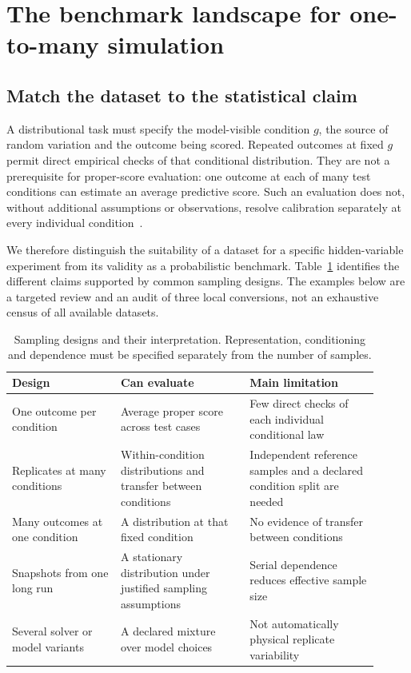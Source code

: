 ﻿%

\section{The benchmark landscape for one-to-many simulation}
\label{sec:bench}

\subsection{Match the dataset to the statistical claim}
\label{sec:bench:criterion}

A distributional task must specify the model-visible condition $g$, the source
of random variation and the outcome being scored. Repeated outcomes at fixed
$g$ permit direct empirical checks of that conditional distribution. They are
not a prerequisite for proper-score evaluation: one outcome at each of many
test conditions can estimate an average predictive score. Such an evaluation
does not, without additional assumptions or observations, resolve calibration
separately at every individual condition~\cite{gneiting2007strictly}.

We therefore distinguish the suitability of a dataset for a specific
hidden-variable experiment from its validity as a probabilistic benchmark.
Table~\ref{tab:landscape} identifies the different claims supported by common
sampling designs. The examples below are a targeted review and an audit of
three local conversions, not an exhaustive census of all available datasets.

\begin{table}[t]
\centering
\small
\caption{Sampling designs and their interpretation. Representation, conditioning
and dependence must be specified separately from the number of samples.}
\label{tab:landscape}
\begin{tabular}{@{}p{0.27\linewidth}p{0.32\linewidth}p{0.32\linewidth}@{}}
\toprule
\textbf{Design} & \textbf{Can evaluate} & \textbf{Main limitation} \\
\midrule
One outcome per condition &
Average proper score across test cases &
Few direct checks of each individual conditional law \\
Replicates at many conditions &
Within-condition distributions and transfer between conditions &
Independent reference samples and a declared condition split are needed \\
Many outcomes at one condition &
A distribution at that fixed condition &
No evidence of transfer between conditions \\
Snapshots from one long run &
A stationary distribution under justified sampling assumptions &
Serial dependence reduces effective sample size \\
Several solver or model variants &
A declared mixture over model choices &
Not automatically physical replicate variability \\
\bottomrule
\end{tabular}
\end{table}


